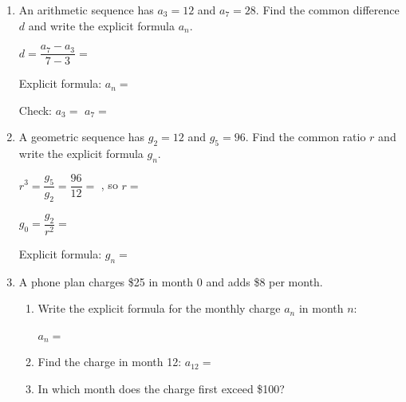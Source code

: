 \documentclass[10pt]{article}
\begin{document}
\begin{tcolorbox}[colback=white, colframe=black!40,
    title=\textbf{Tier A --- Apply},
    fonttitle=\bfseries, arc=2mm, left=3mm, right=3mm, top=2mm, bottom=2mm]

\begin{enumerate}[itemsep=12pt]

  \item An arithmetic sequence has $a_3 = 12$ and $a_7 = 28$.
        Find the common difference $d$ and write the explicit formula $a_n$.

        \vspace{0.04in}
        $d = \dfrac{a_7 - a_3}{7 - 3} = $ \blank{4cm}

        \vspace{0.04in}
        Explicit formula: $a_n = $ \blank{6cm}

        \vspace{0.04in}
        Check: $a_3 = $ \blank{2.5cm} \quad $a_7 = $ \blank{2.5cm}

  \item A geometric sequence has $g_2 = 12$ and $g_5 = 96$.
        Find the common ratio $r$ and write the explicit formula $g_n$.

        \vspace{0.04in}
        $r^3 = \dfrac{g_5}{g_2} = \dfrac{96}{12} = $ \blank{1.5cm}, so $r = $ \blank{1.5cm}

        \vspace{0.04in}
        $g_0 = \dfrac{g_2}{r^2} = $ \blank{3cm}

        \vspace{0.04in}
        Explicit formula: $g_n = $ \blank{6cm}

  \item A phone plan charges \$25 in month 0 and adds \$8 per month.

        \begin{enumerate}[label=(\alph*), itemsep=6pt]
          \item Write the explicit formula for the monthly charge $a_n$ in month $n$:

                $a_n = $ \blank{5cm}

          \item Find the charge in month 12: $a_{12} = $ \blank{3cm}

          \item In which month does the charge first exceed \$100? \blank{3cm}
        \end{enumerate}

\end{enumerate}
\end{tcolorbox}
\end{document}
